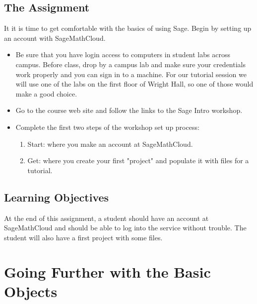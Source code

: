 \documentclass[10pt,]{book}
\theoremstyle{plain}
\theoremstyle{definition}
\numberwithin{equation}{section}
\begin{document}
\subsection[The Assignment]{The Assignment}\label{subsection-15}
It it is time to get comfortable with the basics of using Sage. Begin by
      setting up an account with SageMathCloud.%
\begin{itemize}
\item{}Be sure that you have login access to computers in student labs across
          campus. Before class, drop by a campus lab and make sure your credentials
          work properly and you can sign in to a machine. For our tutorial session
          we will use one of the labs on the first floor of Wright Hall, so one
          of those would make a good choice.%

        \item{}Go to the course web site and follow the links to the Sage Intro
          workshop.%

        \item{}Complete the first two steps of the workshop set up process:
          \begin{enumerate}
\item{}Start: where you make an account at SageMathCloud.\item{}Get: where you create your first "project" and populate it with
              files for a tutorial.\end{enumerate}
%

        \end{itemize}
\typeout{************************************************}
\typeout{************************************************}
\subsection[Learning Objectives]{Learning Objectives}\label{subsection-16}
At the end of this assignment, a student should have an account at
        SageMathCloud and should be able to log into the service without trouble.
        The student will also have a first project with some files.%
\clearpage
\typeout{************************************************}
\typeout{************************************************}
\section[Going Further with the Basic Objects]{Going Further with the Basic Objects}\label{basic-objects-going-further}
\typeout{************************************************}
\typeout{************************************************}
\end{document}
